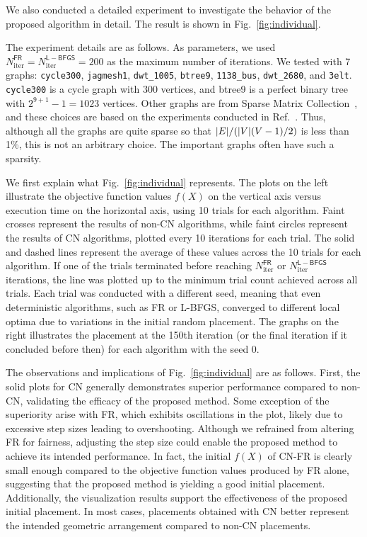 \documentclass[dvipdfmx,10pt,journal,compsoc]{IEEEtran}
\begin{document}
We also conducted a detailed experiment to investigate the behavior of the proposed algorithm in detail. The result is shown in Fig.~\ref{fig:individual}.

The experiment details are as follows.
As parameters, we used $N_\mathrm{iter}^\mathsf{FR} = N_\mathrm{iter}^\mathsf{L-BFGS} = 200$ as the maximum number of iterations.
We tested with 7 graphs: \texttt{cycle300}, \texttt{jagmesh1}, \texttt{dwt\_1005}, \texttt{btree9}, \texttt{1138\_bus}, \texttt{dwt\_2680}, and \texttt{3elt}. \texttt{cycle300} is a cycle graph with 300 vertices, and btree9 is a perfect binary tree with $2^{9+1}-1=1023$ vertices. Other graphs are from Sparse Matrix Collection~\cite{davis2011university}, and these choices are based on the experiments conducted in Ref.~\cite{8419285}. Thus, although all the graphs are quite sparse so that $\abs{E} / (\abs{V}(V-1)/2)$ is less than 1\%, this is not an arbitrary choice. The important graphs often have such a sparsity.

We first explain what Fig.~\ref{fig:individual} represents.
The plots on the left illustrate the objective function values $f(X)$ on the vertical axis versus execution time on the horizontal axis, using 10 trials for each algorithm.
Faint crosses represent the results of non-\textsf{CN} algorithms, while faint circles represent the results of \textsf{CN} algorithms, plotted every 10 iterations for each trial.
The solid and dashed lines represent the average of these values across the 10 trials for each algorithm.
If one of the trials terminated before reaching $N_\mathrm{iter}^\mathsf{FR}$ or $N_\mathrm{iter}^\mathsf{L-BFGS}$ iterations, the line was plotted up to the minimum trial count achieved across all trials.
Each trial was conducted with a different seed, meaning that even deterministic algorithms, such as
\textsf{FR} or \textsf{L-BFGS}, converged to different local optima due to variations in the initial random placement.
The graphs on the right illustrates the placement at the 150th iteration (or the final iteration if it concluded before then) for each algorithm with the seed 0.

The observations and implications of Fig.~\ref{fig:individual} are as follows.
First, the solid plots for \textsf{CN} generally demonstrates superior performance compared to non-\textsf{CN}, validating the efficacy of the proposed method.
Some exception of the superiority arise with \textsf{FR}, which exhibits oscillations in the plot, likely due to excessive step sizes leading to overshooting.
Although we refrained from altering \textsf{FR} for fairness, adjusting the step size could enable the proposed method to achieve its intended performance.
In fact, the initial $f(X)$ of \textsf{CN-FR} is clearly small enough compared to the objective function values produced by \textsf{FR} alone, suggesting that the proposed method is yielding a good initial placement.
Additionally, the visualization results support the effectiveness of the proposed initial placement. In most cases, placements obtained with \textsf{CN} better represent the intended geometric arrangement compared to non-\textsf{CN} placements.
\end{document}
